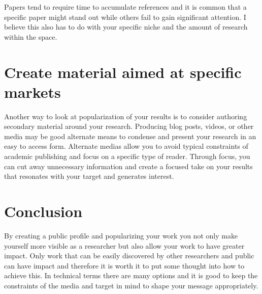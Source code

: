 Papers tend to require time to accumulate references and it is common that a specific paper might stand out while others fail to gain significant attention.
I believe this also has to do with your specific niche and the amount of research within the space.

\section{Create material aimed at specific markets}

Another way to look at popularization of your results is to consider authoring secondary material around your research.
Producing blog posts, videos, or other media may be good alternate means to condense and present your research in an easy to access form.
Alternate medias allow you to avoid typical constraints of academic publishing and focus on a specific type of reader.
Through focus, you can cut away unnecessary information and create a focused take on your results that resonates with your target and generates interest.

\section{Conclusion}

By creating a public profile and popularizing your work you not only make yourself more visible as a researcher but also allow your work to have greater impact.
Only work that can be easily discovered by other researchers and public can have impact and therefore it is worth it to put some thought into how to achieve this.
In technical terms there are many options and it is good to keep the constraints of the media and target in mind to shape your message appropriately.
